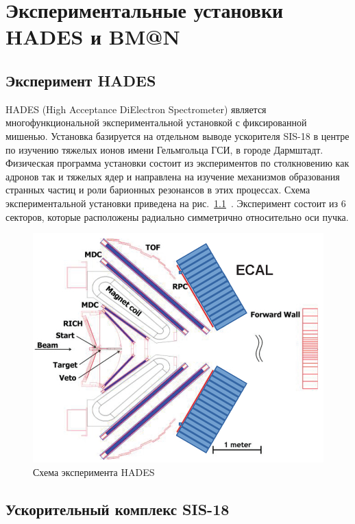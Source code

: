 \chapter{Экспериментальные установки HADES и BM@N} \label{chapt2}

\section{Эксперимент HADES}


HADES (High Acceptance DiElectron Spectrometer) является многофункциональной экспериментальной установкой с фиксированной мишенью.
Установка базируется на отдельном выводе ускорителя SIS-18 в центре по изучению тяжелых ионов имени Гельмгольца ГСИ, в городе Дармштадт.
Физическая программа установки состоит из экспериментов по столкновению как адронов так и тяжелых ядер и направлена на изучение механизмов образования странных частиц и роли барионных резонансов в этих процессах. 
Схема экспериментальной установки приведена на рис.~\ref{fig:hades_bmn_layouts}~\cite{HADES:2009aat}.
Эксперимент состоит из 6 секторов, которые расположены радиально симметрично относительно оси пучка.
%
\begin{figure}[ht]
\begin{center}
\includegraphics[width=0.75\linewidth]{images/hades_layout.jpg}
\caption{Схема эксперимента HADES}
\label{fig:hades_bmn_layouts}
\end{center}
\end{figure}

\section{Ускорительный комплекс SIS-18}

